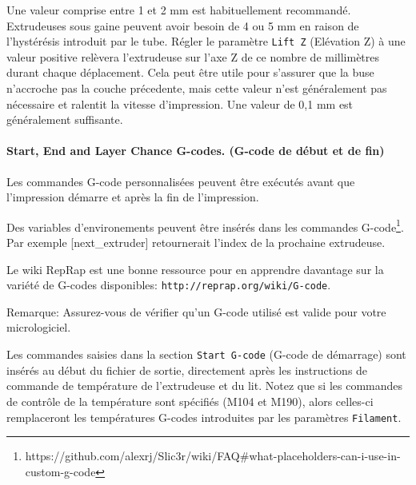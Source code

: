 Une valeur comprise entre 1 et 2 mm est habituellement recommand\'e. Extrudeuses sous gaine peuvent avoir besoin de 4 ou 5 mm en raison de l'hyst\'er\'esis introduit par le tube.
R\'egler le param\`etre \texttt{Lift Z} (El\'evation Z) \`a une valeur positive rel\`evera l'extrudeuse sur l'axe Z de ce nombre de millim\`etres durant chaque d\'eplacement. Cela peut \^etre utile pour s'assurer que la buse n'accroche pas la couche pr\'ecedente, mais cette valeur n'est g\'en\'eralement pas n\'ecessaire et ralentit la vitesse d'impression. Une valeur de 0,1 mm est g\'en\'eralement suffisante.

\paragraph{Start, End and Layer Chance G-codes. (G-code de début et de fin)} %
\label{par:start_end_g_code}
Les commandes G-code personnalis\'ees peuvent \^etre ex\'ecut\'es avant que l'impression d\'emarre et apr\`es la fin de l'impression.

Des variables d'environements peuvent \^etre ins\'er\'es dans les commandes G-code\footnote{https://github.com/alexrj/Slic3r/wiki/FAQ\#what-placeholders-can-i-use-in-custom-g-code}.  Par exemple [next\_extruder] retournerait l'index de la prochaine extrudeuse.

Le wiki RepRap est une bonne ressource pour en apprendre davantage sur la vari\'et\'e de G-codes disponibles: \texttt{http://reprap.org/wiki/G-code}.

Remarque: Assurez-vous de v\'erifier qu'un G-code utilis\'e est valide pour votre micrologiciel.

Les commandes saisies dans la section \texttt{Start G-code} (G-code de d\'emarrage) 
sont ins\'er\'es au d\'ebut du fichier de sortie, directement apr\`es les instructions de commande de temp\'erature de l'extrudeuse et du lit. Notez que si les commandes de contr\^ole de la temp\'erature sont sp\'ecifi\'es (M104 et M190), alors celles-ci remplaceront les temp\'eratures G-codes introduites par les param\`etres \texttt{Filament}.

